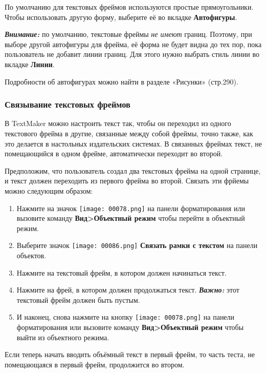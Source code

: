 \documentclass[a4paper,10pt]{article}
\begin{document}
По умолчанию для текстовых фреймов используются простые прямоугольники. Чтобы использовать другую форму, выберите её во вкладке \textbf{Автофигуры}.

\begin{mdframed}[backgroundcolor=blue!10]
\textbf{\textit{Внимание:}} по умолчанию,  текстовые фреймы \textit{не имеют} границ. Поэтому, при выборе другой автофигуры для фрейма, её форма не будет видна до тех пор, пока пользователь не добавит линии границ. Для этого нужно выбрать стиль линии во вкладке \textbf{Линии}.
\end{mdframed}

Подробности об автофигурах можно найти в разделе «Рисунки» (стр.290).

\subsubsection{Связывание текстовых фреймов}
В TextMaker можно настроить текст так, чтобы он переходил из одного текстового фрейма в другие, связанные между собой фреймы, точно также, как это делается в настольных издательских системах. В связанных фреймах текст, не помещающийся в одном фрейме, автоматически переходит во второй.

Предположим, что пользователь создал два текстовых фрейма на одной странице, и текст должен переходить из первого фрейма во второй. Связать эти фрйемы можно следующим образом:

\begin{enumerate}
 \item Нажмите на значок \texttt{[image: 00078.png]} на панели форматирования или вызовите команду \textbf{Вид>Объектный режим} чтобы перейти в объектный режим.
 \item Выберите значок \texttt{[image: 00086.png]} \textbf{Связать рамки с текстом} на панели объектов.
 \item Нажмите на текстовый фрейм, в котором должен начинаться текст.
 \item Нажмите на фрей, в котором должен продолжаться текст. \textit{\textbf{Важно:}} этот текстовый фрейм должен быть пустым.
 \item И наконец, снова нажмите на кнопку \texttt{[image: 00078.png]} на панели форматирования или вызовите команду \textbf{Вид>Объектный режим} чтобы выйти из объектного режима.
\end{enumerate}

Если теперь начать вводить объёмный текст в первый фрейм, то часть теста, не помещающаяся в первый фрейм, продолжится во втором.
\end{document}
